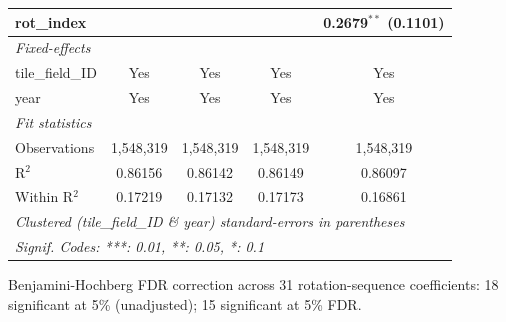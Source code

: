 \begin{tabular}{lcccc}
   rot\_index        &                         &                        &                        & 0.2679$^{**}$ (0.1101)\\   
   \midrule
   \emph{Fixed-effects}\\
   tile\_field\_ID   & Yes                     & Yes                    & Yes                    & Yes\\  
   year              & Yes                     & Yes                    & Yes                    & Yes\\  
   \midrule
   \emph{Fit statistics}\\
   Observations      & 1,548,319               & 1,548,319              & 1,548,319              & 1,548,319\\  
   R$^2$             & 0.86156                 & 0.86142                & 0.86149                & 0.86097\\  
   Within R$^2$      & 0.17219                 & 0.17132                & 0.17173                & 0.16861\\  
   \midrule \midrule
   \multicolumn{5}{l}{\emph{Clustered (tile\_field\_ID \& year) standard-errors in parentheses}}\\
   \multicolumn{5}{l}{\emph{Signif. Codes: ***: 0.01, **: 0.05, *: 0.1}}\\
\end{tabular}
 
\par \raggedright 
Benjamini-Hochberg FDR correction across 31 rotation-sequence coefficients: 18 significant at 5\% (unadjusted); 15 significant at 5\% FDR.
\par\endgroup


